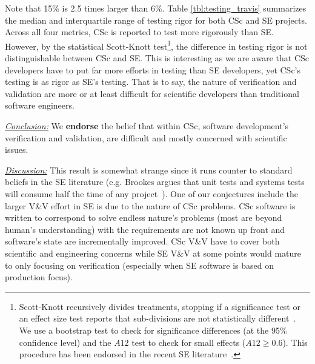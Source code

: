 \documentclass[conference,10pt]{IEEEtran}
\newcommand{\bi}{\begin{itemize}}
\newenvironment{RQ}{\vspace{1mm}\begin{tcolorbox}[enhanced,width=3.4in,size=fbox,colback=red!5!white,drop shadow southeast,sharp corners]}{\end{tcolorbox}}
\begin{document}
Note that  15\% is 2.5 times larger than 6\%. Table \ref{tbl:testing_travis} summarizes the median and interquartile range of testing rigor for both CSc and SE projects. Across all four metrics, CSc is reported to test more rigorously than SE. However, by the statistical Scott-Knott test\footnote{
Scott-Knott recursively divides treatments, stopping if
a significance test or an effect size test reports that sub-divisions are
not statistically different~\cite{mittas2013ranking, ghotra15}.
We use a bootstrap test to check for significance differences (at the 95\% confidence level) 
and the $\mathit{A12}$ test to check for small effects ($\mathit{A12}\ge0.6$).
This procedure has been endorsed in the recent SE literature~\cite{mittas2013ranking,arcuri2011practical}.}, the difference in testing rigor is not distinguishable between CSc and SE. This is interesting as we are aware that CSc developers have to put far more efforts in testing than SE developers, yet CSc's testing is as rigor as SE's testing. That is
to say, the nature of verification and validation are more or at least difficult for scientific developers than traditional software engineers.

\begin{RQ}
\textit{\underline{Conclusion:}}
We \textbf{endorse} the belief that within CSc, software development's verification and validation, are difficult and mostly concerned with scientific issues. 
\end{RQ} 


\noindent\textit{\underline{Discussion:}} This result is somewhat strange since it runs counter to standard beliefs in the SE literature (e.g. Brookes argues that unit tests and systems tests will consume half the time of any project~\cite{brooks1995mythical}). One of our conjectures include the larger V\&V effort in SE  is due to the nature of CSc problems. CSc software is written to correspond to solve endless nature's problems (most are beyond human's understanding) with the requirements are not known up front and software's state are incrementally improved. CSc V\&V have to cover both scientific and engineering concerns while SE V\&V at some points would mature to only focusing on verification (especially when SE software is based on production focus). 
\end{document}
